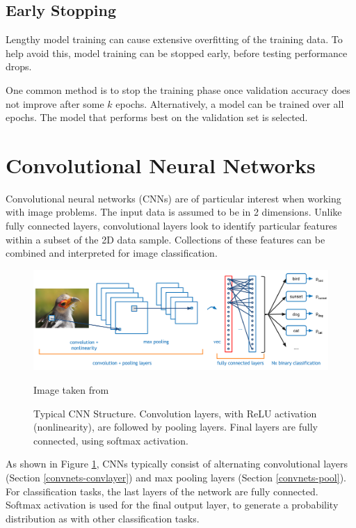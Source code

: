 \subsection{Early Stopping}\label{nnets-earlystop}

Lengthy model training can cause extensive overfitting of the training data. To help avoid this, model training can be stopped early, before testing performance drops.

One common method is to stop the training phase once validation accuracy does not improve after some $k$ epochs. Alternatively, a model can be trained over all epochs. The model that performs best on the validation set is selected.

\section{Convolutional Neural Networks}\label{convnets}

Convolutional neural networks (CNNs) are of particular interest when working with image problems. The input data is assumed to be in 2 dimensions. Unlike fully connected layers, convolutional layers look to identify particular features within a subset of the 2D data sample. Collections of these features can be combined and interpreted for image classification.

\begin{figure}[ht]
	\centering
	\includegraphics[width=\textwidth]{Images/3_cnn_structure.png}
	\caption{Typical CNN Structure. Convolution layers, with ReLU activation (nonlinearity), are followed by pooling layers. Final layers are fully connected, using softmax activation.}
	\small Image taken from \cite{ADeshpande2016}
	\label{convnets-structurefig}
\end{figure}

As shown in Figure \ref{convnets-structurefig}, CNNs typically consist of alternating convolutional layers (Section \ref{convnets-convlayer}) and max pooling layers (Section \ref{convnets-pool}). For classification tasks, the last layers of the network are fully connected. Softmax activation is used for the final output layer, to generate a probability distribution as with other classification tasks.

